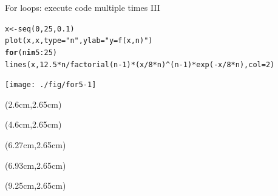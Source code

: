 \documentclass[xcolor=table,       handout,    xcolor=dvipsnames]{beamer}\usepackage[]{graphicx}\usepackage[]{color}
\makeatletter
\newcommand{\hlnum}[1]{\textcolor[rgb]{0,0,0}{#1}}
\newcommand{\hlstr}[1]{\textcolor[rgb]{0.545,0.137,0.137}{#1}}
\newcommand{\hlopt}[1]{\textcolor[rgb]{0,0,0}{#1}}
\newcommand{\hlstd}[1]{\textcolor[rgb]{0,0,0}{#1}}
\newcommand{\hlkwa}[1]{\textcolor[rgb]{1,0,0}{\textbf{#1}}}
\newcommand{\hlkwb}[1]{\textcolor[rgb]{0,0,0}{#1}}
\newcommand{\hlkwc}[1]{\textcolor[rgb]{1,0,1}{#1}}
\newcommand{\hlkwd}[1]{\textcolor[rgb]{0,0,1}{#1}}
\newenvironment{kframe}{%
 \def\at@end@of@kframe{}%
 \ifinner\ifhmode%
  \def\at@end@of@kframe{\end{minipage}}%
  \begin{minipage}{\columnwidth}%
 \fi\fi%
 \def\FrameCommand##1{\hskip\@totalleftmargin \hskip-\fboxsep
 \colorbox{shadecolor}{##1}\hskip-\fboxsep
     \hskip-\linewidth \hskip-\@totalleftmargin \hskip\columnwidth}%
 \MakeFramed {\advance\hsize-\width
   \@totalleftmargin\z@ \linewidth\hsize
   \@setminipage}}%
 {\par\unskip\endMakeFramed%
 \at@end@of@kframe}
\newenvironment{knitrout}{}{} %
\makeatother
\begin{document}

\begin{frame}[fragile]{For loops: execute code multiple times III}
\begin{knitrout}\footnotesize
{}\color{fgcolor}\begin{kframe}
\begin{alltt}
\hlstd{x} \hlkwb{<-} \hlkwd{seq}\hlstd{(}\hlnum{0}\hlstd{,}\hlnum{25}\hlstd{,}\hlnum{0.1}\hlstd{)}
\hlkwd{plot}\hlstd{(x,x,} \hlkwc{type}\hlstd{=}\hlstr{"n"}\hlstd{,} \hlkwc{ylab}\hlstd{=}\hlstr{"y = f(x,n)"}\hlstd{)}
\hlkwa{for} \hlstd{(n} \hlkwa{in} \hlnum{5}\hlopt{:}\hlnum{25}\hlstd{)}
\hlkwd{lines}\hlstd{(x,} \hlnum{12.5}\hlopt{*}\hlstd{n}\hlopt{/}\hlkwd{factorial}\hlstd{(n}\hlopt{-}\hlnum{1}\hlstd{)}\hlopt{*}\hlstd{(x}\hlopt{/}\hlnum{8}\hlopt{*}\hlstd{n)}\hlopt{^}\hlstd{(n}\hlopt{-}\hlnum{1}\hlstd{)}\hlopt{*}\hlkwd{exp}\hlstd{(}\hlopt{-}\hlstd{x}\hlopt{/}\hlnum{8}\hlopt{*}\hlstd{n),} \hlkwc{col}\hlstd{=}\hlnum{2}\hlstd{)}
\end{alltt}
\end{kframe}

{\centering \texttt{[image: ./fig/for5-1]} 

}



\end{knitrout}
\begin{textblock*}{0.2cm}(2.6cm,2.65cm)
\vspace{0.45cm} ~
\end{textblock*}
%
\begin{textblock*}{0.2cm}(4.6cm,2.65cm)
\vspace{0.45cm} ~
\end{textblock*}
%
\begin{textblock*}{0.2cm}(6.27cm,2.65cm)
\vspace{0.45cm} ~
\end{textblock*}
%
\begin{textblock*}{0.2cm}(6.93cm,2.65cm)
\vspace{0.45cm} ~
\end{textblock*}
%
\begin{textblock*}{0.2cm}(9.25cm,2.65cm)
\vspace{0.45cm} ~
\end{textblock*}
%
\end{frame}

\end{document}
